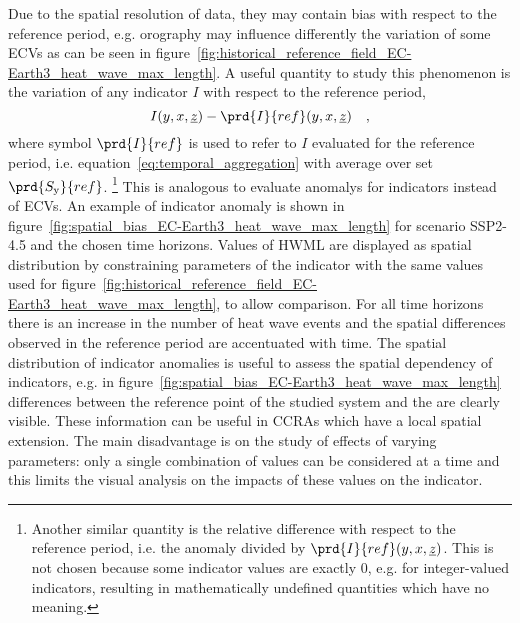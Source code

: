 Due to the spatial resolution of data, they may contain bias with respect to the reference period, e.g. orography may influence differently the variation of some \glspl{ECV} as can be seen in figure~\ref{fig:historical_reference_field_EC-Earth3_heat_wave_max_length}.
A useful quantity to study this phenomenon is the variation of any \gls{indicator} $I$ with respect to the reference period,
\begin{equation}
  \label{eq:spatial_bias}
  I(y, x, \underline{z}) - \prd{I}{ref}(y, x, \underline{z})
  \quad ,
\end{equation}
where symbol $\prd{I}{ref}$ is used to refer to $I$ evaluated for the reference period, i.e. equation~\eqref{eq:temporal_aggregation} with average over set $\prd{S_\text{y}}{ref}$.%
\footnote{Another similar quantity is the relative difference with respect to the reference period, i.e. the anomaly divided by $\prd{I}{ref}(y, x, \underline{z})$. This is not chosen because some indicator values are exactly 0, e.g. for integer-valued indicators, resulting in mathematically undefined quantities which have no meaning.}
This is analogous to evaluate \glspl{anomaly} for indicators instead of \glspl{ECV}.
An example of indicator anomaly is shown in figure~\ref{fig:spatial_bias_EC-Earth3_heat_wave_max_length} for scenario SSP2-4.5 and the chosen time horizons. Values of $\mathrm{HWML}$ are displayed as spatial distribution by constraining parameters of the indicator with the same values used for figure~\ref{fig:historical_reference_field_EC-Earth3_heat_wave_max_length}, to allow comparison. For all time horizons there is an increase in the number of heat wave events and the spatial differences observed in the reference period are accentuated with time. The spatial distribution of indicator anomalies is useful to assess the spatial dependency of indicators, e.g. in figure~\ref{fig:spatial_bias_EC-Earth3_heat_wave_max_length} differences between the reference point of the studied system and the are clearly visible. These information can be useful in \glspl{CCRA} which have a local spatial extension. The main disadvantage is on the study of effects of varying parameters: only a single combination of values can be considered at a time and this limits the visual analysis on the impacts of these values on the indicator.


